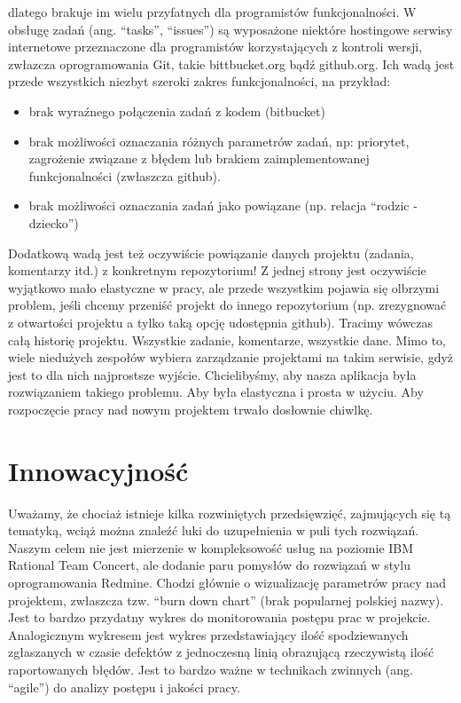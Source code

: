 \documentclass[a4paper,12pt,notitlepage]{mwrep}
\begin{document}
dlatego brakuje im wielu przyfatnych dla programistów funkcjonalności.
W obsługę zadań (ang. “tasks”, “issues”) są wyposażone niektóre hostingowe
serwisy internetowe przeznaczone dla programistów korzystających z kontroli wersji,
zwłazcza oprogramowania Git, takie bittbucket.org bądź github.org.
Ich wadą jest przede wszystkich niezbyt szeroki zakres funkcjonalności, na przykład:
\begin{itemize}
	\item	brak wyraźnego połączenia zadań z kodem (bitbucket)
	\item	brak możliwości oznaczania różnych parametrów zadań,
			np: priorytet, zagrożenie związane z błędem lub brakiem zaimplementowanej funkcjonalności (zwłaszcza github).
	\item	brak możliwości oznaczania zadań jako powiązane (np. relacja “rodzic - dziecko”)
\end{itemize}
Dodatkową wadą jest też oczywiście powiązanie danych projektu
(zadania, komentarzy itd.) z konkretnym repozytorium!
Z jednej strony jest oczywiście wyjątkowo mało elastyczne w pracy,
ale przede wszystkim pojawia się olbrzymi problem, jeśli chcemy przeniść
projekt do innego repozytorium (np. zrezygnować z otwartości projektu
a tylko taką opcję udostępnia github). Tracimy wówczas całą historię projektu.
Wszystkie zadanie, komentarze, wszystkie dane. Mimo to, wiele niedużych
zespołów wybiera zarządzanie projektami na takim serwisie, gdyż jest
to dla nich najprostsze wyjście. Chcielibyśmy, aby nasza aplikacja była
rozwiązaniem takiego problemu. Aby była elastyczna i prosta w użyciu.
Aby rozpoczęcie pracy nad nowym projektem trwało dosłownie chiwlkę.




\section{Innowacyjność}
Uważamy, że chociaż istnieje kilka rozwiniętych przedsięwzięć,
zajmujących się tą tematyką, wciąż można znaleźć luki do uzupełnienia
w puli tych rozwiązań. Naszym celem nie jest mierzenie w kompleksowość
usług na poziomie IBM Rational Team Concert, ale dodanie paru pomysłów
do rozwiązań w stylu oprogramowania Redmine. Chodzi głównie o wizualizację
parametrów pracy nad projektem, zwłaszcza tzw. “burn down chart” (brak popularnej polskiej nazwy).
Jest to bardzo przydatny wykres do monitorowania postępu prac w projekcie.
Analogicznym wykresem jest wykres przedstawiający ilość spodziewanych zgłaszanych
w czasie defektów z jednoczesną linią obrazującą rzeczywistą ilość raportowanych błędów.
Jest to bardzo ważne w technikach zwinnych (ang. “agile”) do analizy postępu i jakości pracy.
\end{document}
